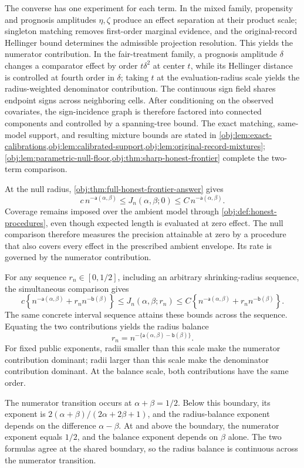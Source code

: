 The converse has one experiment for each term. In the mixed family, propensity
and prognosis amplitudes \(\eta,\zeta\) produce an effect separation at their
product scale; singleton matching removes first-order marginal evidence, and
the original-record Hellinger bound determines the admissible projection
resolution. This yields the numerator contribution. In the fair-treatment
family, a prognosis amplitude \(\delta\) changes a comparator effect by order
\(t\delta^2\) at center \(t\), while its Hellinger distance is controlled at
fourth order in \(\delta\); taking \(t\) at the evaluation-radius scale yields
the radius-weighted denominator contribution. The continuous sign field shares
endpoint signs across neighboring cells. After conditioning on the observed
covariates, the sign-incidence graph is therefore factored into connected
components and controlled by a spanning-tree bound. The exact matching,
same-model support, and resulting mixture bounds are stated in
\cref{obj:lem:exact-calibrations,obj:lem:calibrated-support,obj:lem:original-record-mixtures};
\cref{obj:lem:parametric-null-floor,obj:thm:sharp-honest-frontier} complete the
two-term comparison.

At the null radius, \cref{obj:thm:full-honest-frontier-answer} gives
\[
c\,n^{-\mathsf a(\alpha,\beta)}
\le J_n(\alpha,\beta;0)
\le C\,n^{-\mathsf a(\alpha,\beta)}.
\]
Coverage remains imposed over the ambient model through \cref{obj:def:honest-procedures}, even though expected length is evaluated at zero effect. The null comparison therefore measures the precision attainable at zero by a procedure that also covers every effect in the prescribed ambient envelope. Its rate is governed by the numerator contribution.

For any sequence \(r_n\in[0,1/2]\), including an arbitrary shrinking-radius sequence, the simultaneous comparison gives
\[
c\left\{
n^{-\mathsf a(\alpha,\beta)}
+r_n n^{-\mathsf b(\beta)}
\right\}
\le J_n(\alpha,\beta;r_n)
\le
C\left\{
n^{-\mathsf a(\alpha,\beta)}
+r_n n^{-\mathsf b(\beta)}
\right\}.
\]
The same concrete interval sequence attains these bounds across the sequence. Equating the two contributions yields the radius balance
\[
r_n=n^{-\{\mathsf a(\alpha,\beta)-\mathsf b(\beta)\}}.
\]
For fixed public exponents, radii smaller than this scale make the numerator contribution dominant; radii larger than this scale make the denominator contribution dominant. At the balance scale, both contributions have the same order.

The numerator transition occurs at \(\alpha+\beta=1/2\). Below this boundary, its exponent is \(2(\alpha+\beta)/(2\alpha+2\beta+1)\), and the radius-balance exponent depends on the difference \(\alpha-\beta\). At and above the boundary, the numerator exponent equals \(1/2\), and the balance exponent depends on \(\beta\) alone. The two formulas agree at the shared boundary, so the radius balance is continuous across the numerator transition.

